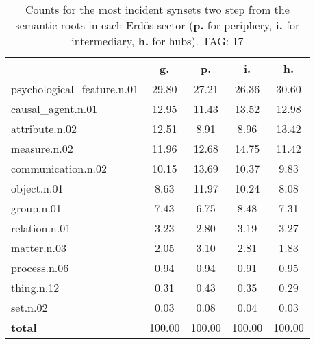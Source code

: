 \begin{table}[h!]
\begin{center}
\begin{tabular}{| l | c | c | c | c |}\hline
 & g. & p. & i. & h. \\\hline
psychological\_feature.n.01 & 29.80  & 27.21  & 26.36  & 30.60 \\\hline
causal\_agent.n.01 & 12.95  & 11.43  & 13.52  & 12.98 \\\hline
attribute.n.02 & 12.51  & 8.91  & 8.96  & 13.42 \\\hline
measure.n.02 & 11.96  & 12.68  & 14.75  & 11.42 \\\hline
communication.n.02 & 10.15  & 13.69  & 10.37  & 9.83 \\\hline
object.n.01 & 8.63  & 11.97  & 10.24  & 8.08 \\\hline
group.n.01 & 7.43  & 6.75  & 8.48  & 7.31 \\\hline
relation.n.01 & 3.23  & 2.80  & 3.19  & 3.27 \\\hline
matter.n.03 & 2.05  & 3.10  & 2.81  & 1.83 \\\hline
process.n.06 & 0.94  & 0.94  & 0.91  & 0.95 \\\hline
thing.n.12 & 0.31  & 0.43  & 0.35  & 0.29 \\\hline
set.n.02 & 0.03  & 0.08  & 0.04  & 0.03 \\\hline
{{\bf total}} & 100.00  & 100.00  & 100.00  & 100.00 \\\hline
\end{tabular}
\caption{Counts for the most incident synsets two step from the semantic roots in each Erd\"os sector ({\bf p.} for periphery, {\bf i.} for intermediary, {\bf h.} for hubs). TAG: 17}
\end{center}
\end{table}